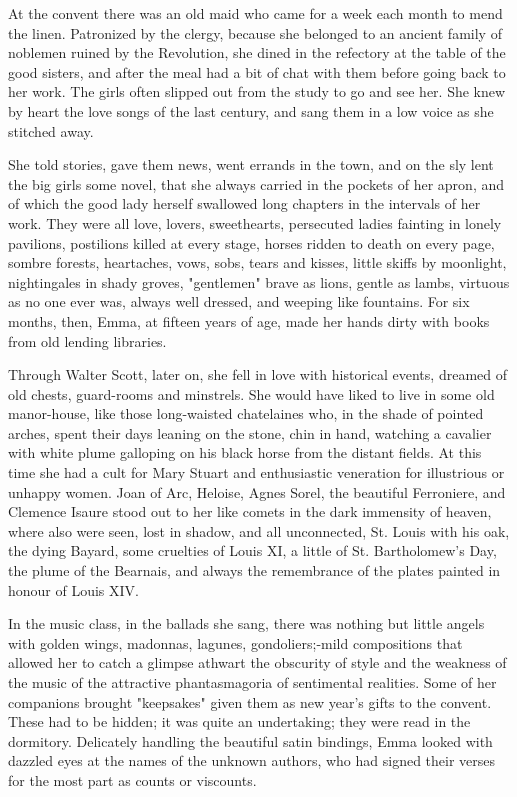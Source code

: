 \documentclass{tufte-book}
\begin{document}
At the convent there was an old maid who came for a week each month to
mend the linen. Patronized by the clergy, because she belonged to an
ancient family of noblemen ruined by the Revolution, she dined in the
refectory at the table of the good sisters, and after the meal had a bit
of chat with them before going back to her work. The girls often slipped
out from the study to go and see her. She knew by heart the love songs
of the last century, and sang them in a low voice as she stitched away.

She told stories, gave them news, went errands in the town, and on
the sly lent the big girls some novel, that she always carried in the
pockets of her apron, and of which the good lady herself swallowed
long chapters in the intervals of her work. They were all love, lovers,
sweethearts, persecuted ladies fainting in lonely pavilions, postilions
killed at every stage, horses ridden to death on every page, sombre
forests, heartaches, vows, sobs, tears and kisses, little skiffs by
moonlight, nightingales in shady groves, "gentlemen" brave as lions,
gentle as lambs, virtuous as no one ever was, always well dressed, and
weeping like fountains. For six months, then, Emma, at fifteen years of
age, made her hands dirty with books from old lending libraries.

Through Walter Scott, later on, she fell in love with historical events,
dreamed of old chests, guard-rooms and minstrels. She would have liked
to live in some old manor-house, like those long-waisted chatelaines
who, in the shade of pointed arches, spent their days leaning on the
stone, chin in hand, watching a cavalier with white plume galloping on
his black horse from the distant fields. At this time she had a cult
for Mary Stuart and enthusiastic veneration for illustrious or unhappy
women. Joan of Arc, Heloise, Agnes Sorel, the beautiful Ferroniere, and
Clemence Isaure stood out to her like comets in the dark immensity of
heaven, where also were seen, lost in shadow, and all unconnected, St.
Louis with his oak, the dying Bayard, some cruelties of Louis XI, a
little of St. Bartholomew's Day, the plume of the Bearnais, and always
the remembrance of the plates painted in honour of Louis XIV.

In the music class, in the ballads she sang, there was nothing but
little angels with golden wings, madonnas, lagunes, gondoliers;-mild
compositions that allowed her to catch a glimpse athwart the obscurity
of style and the weakness of the music of the attractive phantasmagoria
of sentimental realities. Some of her companions brought "keepsakes"
given them as new year's gifts to the convent. These had to be hidden;
it was quite an undertaking; they were read in the dormitory. Delicately
handling the beautiful satin bindings, Emma looked with dazzled eyes at
the names of the unknown authors, who had signed their verses for the
most part as counts or viscounts.
\end{document}
